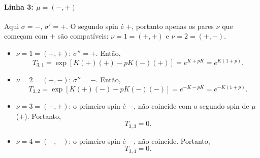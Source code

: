 \documentclass[11pt,a4paper]{article}
\begin{document}
\paragraph{Linha 3: \(\mu = (-,+)\)}
%
Aqui \(\sigma = -\), \(\sigma' = +\). O segundo spin é \(+\), portanto apenas os pares \(\nu\) que começam com \(+\) são compatíveis: \(\nu = 1 = (+,+)\) e \(\nu = 2 = (+,-)\).
%
\begin{itemize}
    \item \(\nu = 1 = (+,+)\): \(\sigma'' = +\). Então,
    \begin{equation}
        T_{3,1} = \exp\left[ K(+)(+) - pK(-)(+) \right] = e^{K + pK} = e^{K(1+p)}.
    \end{equation}
    
    \item \(\nu = 2 = (+,-)\): \(\sigma'' = -\). Então,
    \begin{equation}
        T_{3,2} = \exp\left[ K(+)(-) - pK(-)(-) \right] = e^{-K - pK} = e^{-K(1+p)}.
    \end{equation}
    
    \item \(\nu = 3 = (-,+)\): o primeiro spin é \(-\), não coincide com o segundo spin de \(\mu\) (\(+\)). Portanto,
    \begin{equation}
        T_{3,3} = 0.
    \end{equation}
    
    \item \(\nu = 4 = (-,-)\): o primeiro spin é \(-\), não coincide. Portanto,
    \begin{equation}
        T_{3,4} = 0.
    \end{equation}
\end{itemize}
%
\end{document}
